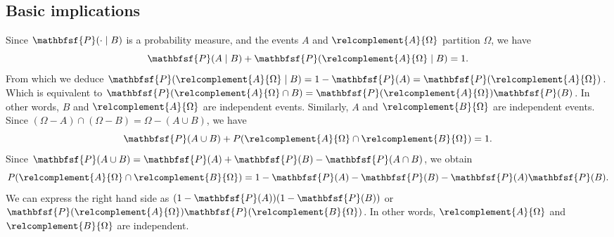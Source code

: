 \subsection*{Basic implications}

Since $\mathbfsf{P} (\cdot \mid  B)$ is a probability measure, and the events $A$ and $\relcomplement{A}{\Omega }$ partition $\Omega $, we have
\[
\mathbfsf{P} (A \mid  B) + \mathbfsf{P} (\relcomplement{A}{\Omega } \mid  B) = 1.
\]
From which we deduce $\mathbfsf{P} (\relcomplement{A}{\Omega } \mid B) = 1 - \mathbfsf{P} (A) = \mathbfsf{P} (\relcomplement{A}{\Omega })$.
Which is equivalent to $\mathbfsf{P} (\relcomplement{A}{\Omega } \cap  B) = \mathbfsf{P} (\relcomplement{A}{\Omega })\mathbfsf{P} (B)$.
In other words, $B$ and $\relcomplement{A}{\Omega }$ are independent events.
Similarly, $A$ and $\relcomplement{B}{\Omega }$ are independent events.
Since $(\Omega  - A) \cap  (\Omega  - B) = \Omega  - (A \cup B)$, we have
\[
\mathbfsf{P} (A \cup B) + P(\relcomplement{A}{\Omega } \cap \relcomplement{B}{\Omega }) = 1.
\]
Since $\mathbfsf{P} (A \cup B) = \mathbfsf{P} (A) + \mathbfsf{P} (B) - \mathbfsf{P} (A \cap  B)$, we obtain
\[
P(\relcomplement{A}{\Omega } \cap  \relcomplement{B}{\Omega }) = 1 - \mathbfsf{P} (A) - \mathbfsf{P} (B) - \mathbfsf{P} (A)\mathbfsf{P} (B).
\]
We can express the right hand side as $(1 - \mathbfsf{P} (A))(1 - \mathbfsf{P} (B))$ or $\mathbfsf{P} (\relcomplement{A}{\Omega })\mathbfsf{P} (\relcomplement{B}{\Omega })$.
In other words, $\relcomplement{A}{\Omega }$ and $\relcomplement{B}{\Omega }$ are independent.
